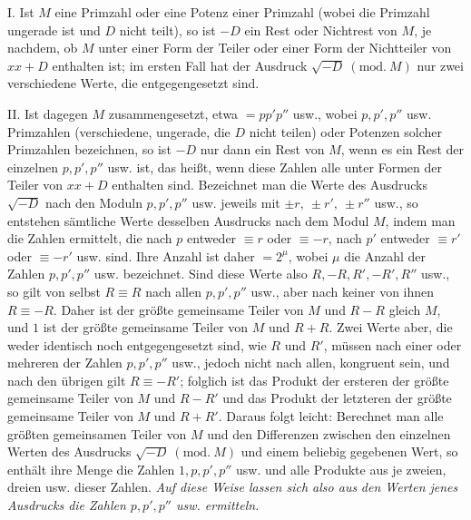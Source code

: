 I. Ist \(M\) eine Primzahl oder eine Potenz einer Primzahl (wobei die Primzahl ungerade ist und \(D\) nicht teilt), so ist \(-D\) ein Rest oder Nichtrest von \(M\), je nachdem, ob \(M\) unter einer Form der Teiler oder einer Form der Nichtteiler von \(xx+D\) enthalten ist; im ersten Fall hat der Ausdruck \(\surd{-D}\ (\mathrm{mod.}\ M)\) nur zwei verschiedene Werte, die entgegengesetzt sind.

II. Ist dagegen \(M\) zusammengesetzt, etwa \(=pp'p''\) usw., wobei \(p,\allowbreak p',\allowbreak p''\) usw. Primzahlen (verschiedene, ungerade, die \(D\) nicht teilen) oder Potenzen solcher Primzahlen bezeichnen, so ist \(-D\) nur dann ein Rest von \(M\), wenn es ein Rest der einzelnen \(p,\allowbreak p',\allowbreak p''\) usw. ist, das heißt, wenn diese Zahlen alle unter Formen der Teiler von \(xx+D\) enthalten sind. Bezeichnet man die Werte des Ausdrucks \(\surd{-D}\) nach den Moduln \(p,\allowbreak p',\allowbreak p''\) usw. jeweils mit \(\pm r,\allowbreak \ \pm r',\allowbreak \ \pm r''\) usw., so entstehen sämtliche Werte desselben Ausdrucks nach dem Modul \(M\), indem man die Zahlen ermittelt, die nach \(p\) entweder \(\equiv r\) oder \(\equiv-r\), nach \(p'\) entweder \(\equiv r'\) oder \(\equiv-r'\) usw. sind. Ihre Anzahl ist daher \(=2^\mu\), wobei \(\mu\) die Anzahl der Zahlen \(p,\allowbreak p',\allowbreak p''\) usw. bezeichnet. Sind diese Werte also \(R,\allowbreak -R,\allowbreak R',\allowbreak -R',\allowbreak R''\) usw., so gilt von selbst \(R\equiv R\) nach allen \(p,\allowbreak p',\allowbreak p''\) usw., aber nach keiner von ihnen \(R\equiv-R\). Daher ist der größte gemeinsame
Teiler von \(M\) und \(R-R\) gleich \(M\), und \(1\) ist der größte gemeinsame Teiler von \(M\) und \(R+R\). Zwei Werte aber, die weder identisch noch entgegengesetzt sind, wie \(R\) und \(R'\), müssen nach einer oder mehreren der Zahlen \(p,\allowbreak p',\allowbreak p''\) usw., jedoch nicht nach allen, kongruent sein, und nach den übrigen gilt \(R\equiv-R'\); folglich ist das Produkt der ersteren der größte gemeinsame Teiler von \(M\) und \(R-R'\) und das Produkt der letzteren der größte gemeinsame Teiler von \(M\) und \(R+R'\). Daraus folgt leicht: Berechnet man alle größten gemeinsamen Teiler von \(M\) und den Differenzen zwischen den einzelnen Werten des Ausdrucks \(\surd{-D}\ (\mathrm{mod.}\ M)\) und einem beliebig gegebenen Wert, so enthält ihre Menge die Zahlen \(1,\allowbreak p,\allowbreak p',\allowbreak p''\) usw. und alle Produkte aus je zweien, dreien usw. dieser Zahlen. \textit{Auf diese Weise lassen sich also aus} \textit{den Werten jenes Ausdrucks die Zahlen \(p,\allowbreak p',\allowbreak p''\) usw. ermitteln.}

